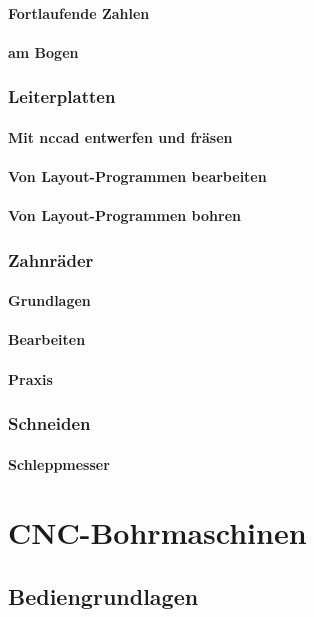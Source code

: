 \documentclass[a5paper]{book}
\begin{document}
			\subsubsection{Fortlaufende Zahlen}
			\subsubsection{am Bogen}
		\subsection{Leiterplatten} 
			\subsubsection{Mit nccad entwerfen und fräsen} 
			\subsubsection{Von Layout-Programmen bearbeiten} 
			\subsubsection{Von Layout-Programmen bohren} 
		\subsection{Zahnräder} 
			\subsubsection{Grundlagen} 
			\subsubsection{Bearbeiten} 
			\subsubsection{Praxis} 			
		\subsection{Schneiden} 
			\subsubsection{Schleppmesser} 
		 
\chapter{CNC-Bohrmaschinen} 
	\section{Bediengrundlagen}
\end{document}
